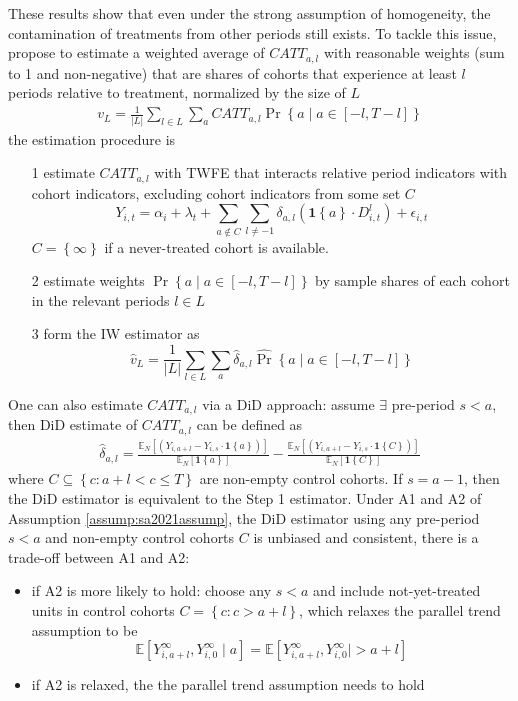 \documentclass[twoside]{article}
\begin{document}
These results show that even under the strong assumption of homogeneity, the contamination of treatments from other periods still exists. To tackle this issue, \citet{sun2021estimating} propose to estimate a weighted average of $CATT_{a,l}$ with reasonable weights (sum to 1 and non-negative) that are shares of cohorts that experience at least $l$ periods relative to treatment, normalized by the size of $L$ 
\begin{align*}
    v_L = \frac{1}{\left\vert L \right\vert } \sum_{l\in L}\sum_a CATT_{a,l} \Pr \left\{a \mid a \in [-l,T-l] \right\}
\end{align*}
the estimation procedure is 
\begin{itemize}
    \item[1] estimate $CATT_{a,l}$ with TWFE that interacts relative period indicators with cohort indicators, excluding cohort indicators from some set $C$
    $$ Y_{i,t} = \alpha_i + \lambda_t + \sum_{a\not \in C}\sum_{l\neq -1} \delta_{a,l}\left(\mathbf{1}\left\{a\right\}\cdot D^l_{i,t}\right) + \epsilon_{i,t} $$
    $C=\left\{\infty\right\}$ if a never-treated cohort is available.
    \item[2] estimate weights $\Pr \left\{a\mid a \in [-l,T-l]\right\}$ by sample shares of each cohort in the relevant periods $l\in L$
    \item[3] form the IW estimator as $$ \hat{v}_L = \frac{1}{\left\vert L \right\vert } \sum_{l\in L}\sum_a \hat{\delta}_{a,l} \hat{\Pr} \left\{a \mid a \in [-l,T-l] \right\} $$
\end{itemize}
One can also estimate $CATT_{a,l}$ via a DiD approach: assume $\exists$ pre-period $s<a$, then DiD estimate of $CATT_{a,l}$ can be defined as 
\begin{align*}
    \hat{\delta}_{a,l} = \frac{\mathbb{E}_N \left[ \left(Y_{i,a+l}-Y_{i,s}\cdot \mathbf{1}\left\{a\right\}\right) \right]}{\mathbb{E}_N\left[\mathbf{1}\left\{a\right\}\right]} - \frac{\mathbb{E}_N \left[ \left(Y_{i,a+l}-Y_{i,s}\cdot \mathbf{1}\left\{C\right\}\right) \right]}{\mathbb{E}_N\left[\mathbf{1}\left\{C\right\}\right]}
\end{align*}
where $C\subseteq \left\{c:a+l< c\leq T\right\}$ are non-empty control cohorts. If $s=a-1$, then the DiD estimator is equivalent to the Step 1 estimator.
Under A1 and A2 of Assumption \ref{assump:sa2021assump}, the DiD estimator using any pre-period $s<a$ and non-empty control cohorts $C$ is unbiased and consistent, there is a trade-off between A1 and A2:
\begin{itemize}
    \item if A2 is more likely to hold: choose any $s<a$ and include not-yet-treated units in control cohorts $C=\left\{c:c>a+l\right\}$, which relaxes the parallel trend assumption to be $$ \mathbb{E}\left[Y^{\infty}_{i,a+l},Y^{\infty}_{i,0} \mid a \right] = \mathbb{E}\left[Y^{\infty}_{i,a+l},Y^{\infty}_{i,0} \mid >a+l \right] $$
    \item if A2 is relaxed, the the parallel trend assumption needs to hold
\end{itemize}
\end{document}
